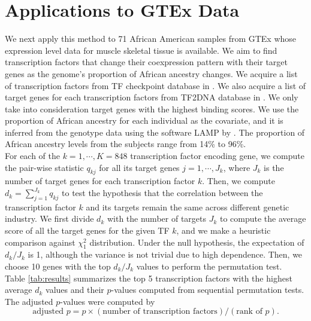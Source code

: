 \documentclass[aap,authoryear, preprint]{imsart}
\numberwithin{equation}{section}
\theoremstyle{plain}
\begin{document}
\section{Applications to GTEx Data} \label{sec:applications}
We next apply this method to 71 African American samples from GTEx \cite{gtex2015genotype} whose expression level data for muscle skeletal tissue is available. We aim to find transcription factors that change their coexpression pattern with their target genes as the genome's proportion of African ancestry changes. We acquire a list of transcription factors from TF checkpoint database  in \cite{chawla2013tfcheckpoint}. We also acquire a list of target genes for each transcription factors from TF2DNA database in \cite{pujato2014prediction}. We only take into consideration target genes with the highest binding scores. We use the proportion of African ancestry for each individual as the covariate, and it is inferred from the genotype data using the software LAMP  by \cite{pacsaniuc2009imputation}. The proportion of African ancestry levels from the subjects range from 14\% to 96\%.\\ 

For each of the $k = 1, \cdots, K = 848$ transcription factor encoding gene, we compute the pair-wise statistic $q_{kj}$ for all its target genes $j = 1, \cdots, J_k$, where $J_k$ is the number of target genes for each transcription factor $k$. Then, we compute $d_k = \sum_{j=1}^{J_k} q_{kj}$ to test the hypothesis that the correlation between the transcription factor $k$ and its targets remain the same across different genetic industry. We first divide $d_k$ with the number of targets $J_k$ to compute the average score of all the target genes for the given TF $k$, and we make a heuristic comparison against $\chi_1^2$ distribution. Under the null hypothesis, the expectation of $d_k/J_k$ is 1, although the variance is not trivial due to high dependence. Then, we choose 10 genes with the top $d_{k}/J_k$ values to perform the permutation test. \\

Table \ref{tab:results} summarizes the top 5 transcription factors with the highest average $d_k$ values and their $p$-values computed from sequential permutation tests. The adjusted $p$-values were computed by
$$\text{adjusted } p = p \times (\text{number of transcription factors}) / (\text{rank of $p$}).$$
\end{document}
